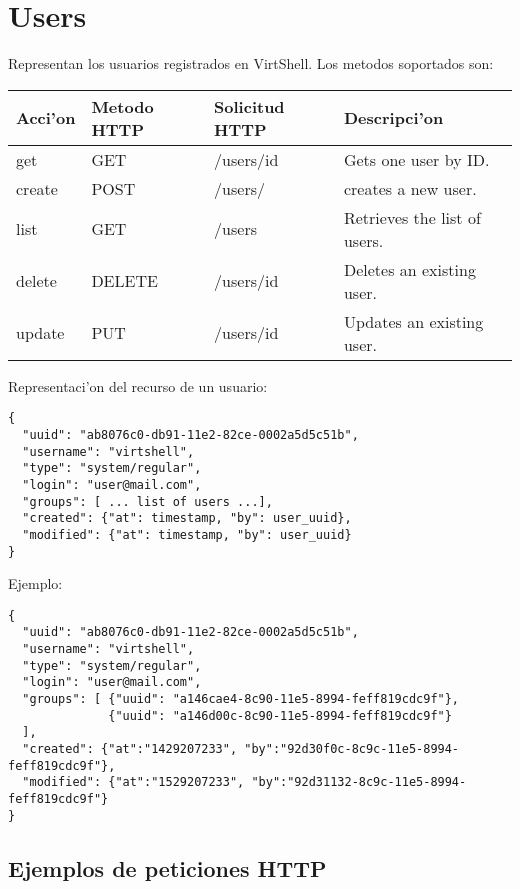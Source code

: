 \section{Users}
Representan los usuarios registrados en VirtShell. Los metodos soportados son:

\begin{center}
 \begin{tabular}{| l | l | l | l |}
 \hline
  \rowcolor{blueapi}
  \textbf{Acci'on} & \textbf{Metodo HTTP} & \textbf{Solicitud HTTP} & \textbf{Descripci'on} \\ [0.5ex] 
  \hline\hline
  get & GET & /users/id & Gets one user by ID. \\
  \hline
  create & POST & /users/ & creates a new user. \\
  \hline
  list & GET & /users & Retrieves the list of users. \\  
  \hline
  delete & DELETE & /users/id & Deletes an existing user. \\
  \hline  
  update & PUT & /users/id & Updates an existing user. \\ [1ex]  
  \hline
\end{tabular}
\end{center}

\vspace{1cm}
Representaci'on del recurso de un usuario:
\vspace{1cm}

\begin{lstlisting}[style=json]
{
  "uuid": "ab8076c0-db91-11e2-82ce-0002a5d5c51b",
  "username": "virtshell",
  "type": "system/regular",
  "login": "user@mail.com",
  "groups": [ ... list of users ...],
  "created": {"at": timestamp, "by": user_uuid},
  "modified": {"at": timestamp, "by": user_uuid}
}
\end{lstlisting}

Ejemplo:

\medskip
\begin{lstlisting}[style=json]
{
  "uuid": "ab8076c0-db91-11e2-82ce-0002a5d5c51b",
  "username": "virtshell",
  "type": "system/regular",
  "login": "user@mail.com",
  "groups": [ {"uuid": "a146cae4-8c90-11e5-8994-feff819cdc9f"},
              {"uuid": "a146d00c-8c90-11e5-8994-feff819cdc9f"}
  ],
  "created": {"at":"1429207233", "by":"92d30f0c-8c9c-11e5-8994-feff819cdc9f"},
  "modified": {"at":"1529207233", "by":"92d31132-8c9c-11e5-8994-feff819cdc9f"}
}
\end{lstlisting}

\subsection{Ejemplos de peticiones HTTP}

